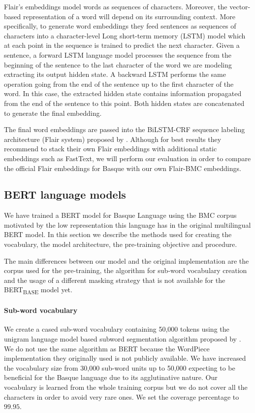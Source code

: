 \documentclass[10pt, a4paper]{article}
\begin{document}
Flair's embeddings model words as sequences of characters. Moreover, the vector-based representation of a word will depend on its surrounding context. More specifically, to generate word embeddings they feed sentences as sequences of characters into a character-level Long short-term memory (LSTM) model which at each point in the sequence is trained to predict the next character. Given a sentence, a forward LSTM language model processes the sequence from the beginning of the sentence to the last character of the word we are modeling extracting its output hidden state. A backward LSTM performs the same operation going from the end of the sentence up to the first character of the word. In this case, the extracted hidden state contains information propagated from the end of the sentence to this point. Both hidden states are concatenated to generate the final embedding.

The final word embeddings are passed into the BiLSTM-CRF sequence labeling architecture (Flair system) proposed by \cite{huang2015bidirectional}. Although for best results they recommend to stack their own Flair embeddings with additional static embeddings such as FastText, we will perform our evaluation in order to compare the official Flair embeddings for Basque with our own Flair-BMC embeddings.

\subsection{BERT language models}\label{sec:build-basq-models:bert}

We have trained a BERT \cite{devlin2019bert} model for Basque Language using the BMC corpus motivated by the low representation this language has in the original multilingual BERT model. In this section we describe the methods used for creating the vocabulary, the model architecture, the pre-training objective and procedure.

The main differences between our model and the original implementation are the corpus used for the pre-training, the algorithm for sub-word vocabulary creation and the usage of a different masking strategy that is not available for the BERT\textsubscript{BASE} model yet. 

\paragraph{Sub-word vocabulary}

We create a cased sub-word vocabulary containing 50,000 tokens using the unigram language model based subword segmentation algorithm proposed by . We do not use the same algorithm as BERT because the WordPiece \cite{wu2016google} implementation they originally used is not publicly available. We have increased the vocabulary size from 30,000 sub-word units up to 50,000 expecting to be beneficial for the Basque language due to its agglutinative nature. Our vocabulary is learned from the whole training corpus but we do not cover all the characters in order to avoid very rare ones. We set the coverage percentage to $99.95$. 
\end{document}
